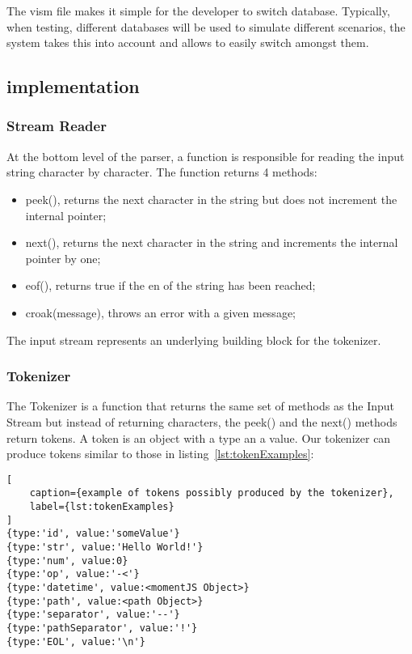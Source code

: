 The vism file makes it simple for the developer to switch database. Typically, when testing, different databases will be used to simulate different scenarios, the system takes this into account and allows to easily switch amongst them.

\subsection{implementation}

\subsubsection{Stream Reader}

At the bottom level of the parser, a function is responsible for reading the input string character by character. The function returns 4 methods:

\begin{itemize}
    \item peek(), returns the next character in the string but does not increment the internal pointer;
    \item next(), returns the next character in the string and increments the internal pointer by one;
    \item eof(), returns true if the en of the string has been reached;
    \item croak(message), throws an error with a given message;
\end{itemize}

The input stream represents an underlying building block for the tokenizer.

\subsubsection{Tokenizer}

The Tokenizer is a function that returns the same set of methods as the Input Stream but instead of returning characters, the peek() and the next() methods return tokens. A token is an object with a type an a value. Our tokenizer can produce tokens similar to those in listing~\ref{lst:tokenExamples}:

\begin{lstlisting}[
    caption={example of tokens possibly produced by the tokenizer},
    label={lst:tokenExamples}
]
{type:'id', value:'someValue'}
{type:'str', value:'Hello World!'}
{type:'num', value:0}
{type:'op', value:'-<'}
{type:'datetime', value:<momentJS Object>}
{type:'path', value:<path Object>}
{type:'separator', value:'--'}
{type:'pathSeparator', value:'!'}
{type:'EOL', value:'\n'}
\end{lstlisting}

